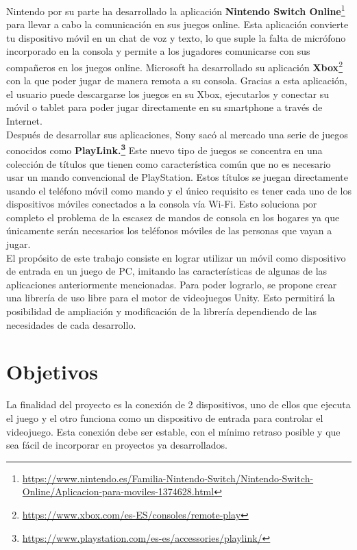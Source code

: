Nintendo por su parte ha desarrollado la aplicaci\'on \textbf{Nintendo Switch Online}\footnote{\url{https://www.nintendo.es/Familia-Nintendo-Switch/Nintendo-Switch-Online/Aplicacion-para-moviles-1374628.html}} para llevar a cabo la comunicaci\'on en sus juegos online. Esta aplicaci\'on convierte tu dispositivo m\'ovil en un chat de voz y texto, lo que suple la falta de micr\'ofono incorporado en la consola y permite a los jugadores comunicarse con sus compa\~neros en los juegos online. Microsoft ha desarrollado su aplicaci\'on \textbf{Xbox}\footnote{\url{https://www.xbox.com/es-ES/consoles/remote-play}} con la que poder jugar de manera remota a su consola. Gracias a esta aplicaci\'on, el usuario puede descargarse los juegos en su Xbox, ejecutarlos y conectar su m\'ovil o tablet para poder jugar directamente en su smartphone a trav\'es de Internet.\\

Despu\'es de desarrollar sus aplicaciones, Sony sac\'o al mercado una serie de juegos conocidos como \textbf{PlayLink.\footnote{\url{https://www.playstation.com/es-es/accessories/playlink/}}} Este nuevo tipo de juegos se concentra en una colecci\'on de t\'itulos que tienen como caracter\'istica com\'un que no es necesario usar un mando convencional de PlayStation. Estos t\'itulos se juegan directamente usando el tel\'efono m\'ovil como mando y el \'unico requisito es tener cada uno de los dispositivos m\'oviles conectados a la consola v\'ia Wi-Fi. Esto soluciona por completo el problema de la escasez de mandos de consola en los hogares ya que \'unicamente ser\'an necesarios los tel\'efonos m\'oviles de las personas que vayan a jugar.\\

El prop\'osito de este trabajo consiste en lograr utilizar un m\'ovil como dispositivo de entrada en un juego de PC, imitando las caracter\'isticas de algunas de las aplicaciones anteriormente mencionadas. Para poder lograrlo, se propone crear una librer\'ia de uso libre para el motor de videojuegos Unity. Esto permitir\'a la posibilidad de ampliaci\'on y modificaci\'on de la librer\'ia dependiendo de las necesidades de cada desarrollo.


\section{Objetivos}

La finalidad del proyecto es la conexi\'on de 2 dispositivos, uno de ellos que ejecuta el juego y el otro funciona como un dispositivo de entrada para controlar el videojuego. Esta conexi\'on debe ser estable, con el m\'inimo retraso posible y que sea f\'acil de incorporar en proyectos ya desarrollados.\\

